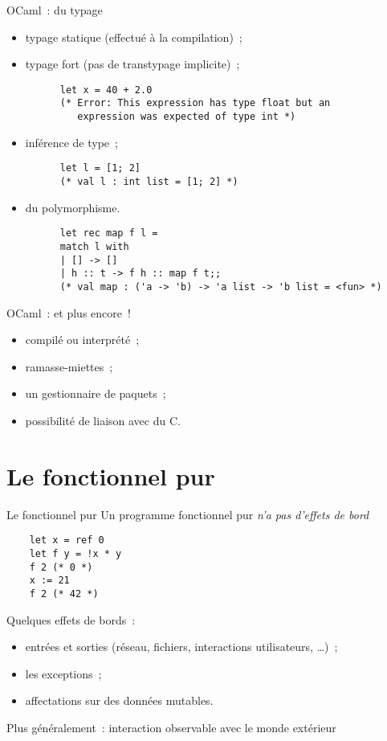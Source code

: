 \documentclass[10pt]{beamer}
\begin{document}
\begin{frame}[fragile]{OCaml~: du typage}
  \begin{itemize}
  \item typage statique (effectué à la compilation)~;
  \item typage fort (pas de transtypage implicite)~;
    \begin{verbatim}
      let x = 40 + 2.0
      (* Error: This expression has type float but an
         expression was expected of type int *)
      \end{verbatim}
  \item inférence de type~;
    \begin{verbatim}
      let l = [1; 2]
      (* val l : int list = [1; 2] *)
    \end{verbatim}
  \item du polymorphisme.
    \begin{verbatim}
      let rec map f l =
      match l with
      | [] -> []
      | h :: t -> f h :: map f t;;
      (* val map : ('a -> 'b) -> 'a list -> 'b list = <fun> *)
    \end{verbatim}
  \end{itemize}
\end{frame}

\begin{frame}{OCaml~: et plus encore~!}
  \begin{itemize}
  \item compilé ou interprété~;
  \item ramasse-miettes~;
  \item un gestionnaire de paquets~;
  \item possibilité de liaison avec du C.
  \end{itemize}
\end{frame}

\section{Le fonctionnel pur}

\begin{frame}[fragile]{Le fonctionnel pur}
  Un programme fonctionnel pur \emph{n'a pas d'effets de bord}
  \begin{verbatim}
    let x = ref 0
    let f y = !x * y
    f 2 (* 0 *)
    x := 21
    f 2 (* 42 *)
  \end{verbatim}

  Quelques effets de bords~:
  \begin{itemize}
  \item entrées et sorties (réseau, fichiers, interactions
    utilisateurs, …)~;
  \item les exceptions~;
  \item affectations sur des données mutables.
  \end{itemize}
  Plus généralement~: interaction observable avec le monde extérieur
\end{frame}
\end{document}
